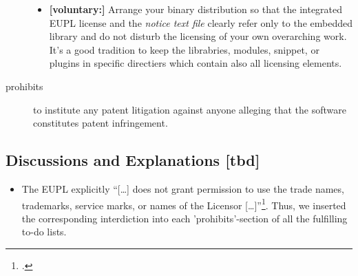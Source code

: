 \begin{description}
\begin{itemize}
 \item \textbf{[voluntary:]} Arrange your binary distribution so that the
  integrated EUPL license and the \emph{notice text file} clearly refer only
  to the embedded library and do not disturb the licensing of your own
  overarching work. It's a good tradition to keep the librabries, modules,
  snippet, or plugins in specific directiers which contain also all licensing
  elements.
  
\end{itemize}

\item[prohibits] to institute any patent litigation against anyone alleging that
the software constitutes patent infringement.

\end{description}

\subsection{Discussions and Explanations [tbd]}




\begin{itemize}
  \item The EUPL explicitly \enquote{[\ldots] does not grant permission to use
  the trade na\-mes, trademarks, service marks, or names of the Licensor
  [\ldots]}\footcite[cf.][\nopage wp\ §5, Section \enquote{Legal
  Protection}]{EuplLicense2007en}. Thus, we inserted the corresponding
  interdiction into each 'prohibits'-section of all the fulfilling to-do lists.
\end{itemize}


%
